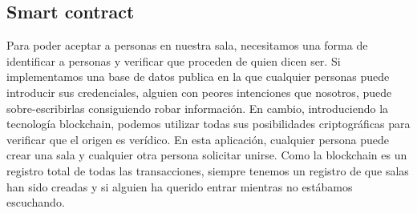 \subsection{Smart contract}
Para poder aceptar a personas en nuestra sala, necesitamos una forma de identificar a personas y verificar que proceden de quien dicen ser. Si implementamos una base de datos publica en la que cualquier personas puede introducir sus credenciales, alguien con peores intenciones que nosotros, puede sobre-escribirlas consiguiendo robar información.
En cambio, introduciendo la tecnología blockchain, podemos utilizar todas sus posibilidades criptográficas para verificar que el origen es verídico.
En esta aplicación, cualquier persona puede crear una sala y cualquier otra persona solicitar unirse. Como la blockchain es un registro total de todas las transacciones, siempre tenemos un registro de que salas han sido creadas y si alguien ha querido entrar mientras no estábamos escuchando.
